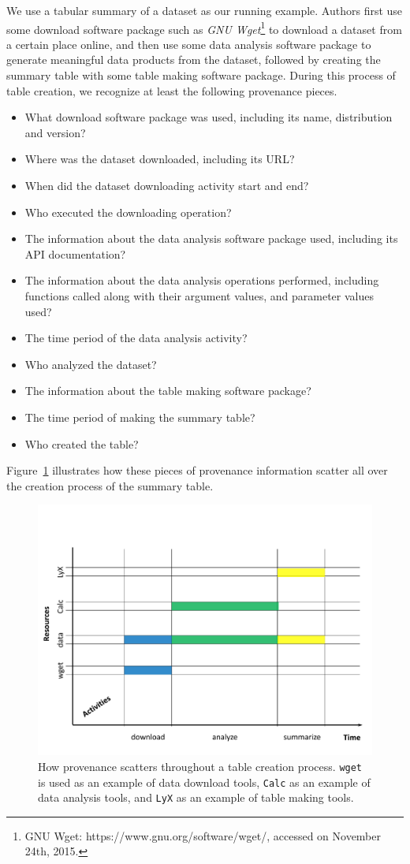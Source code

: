 We use a tabular summary of a dataset as our running example. Authors first use some 
download software package such as \emph{GNU Wget}\footnote{GNU Wget: https://www.gnu.org/software/wget/, accessed on November 24th, 2015.} to download a dataset from a certain place online, and then 
use some data analysis software package to generate meaningful data products from the dataset, 
followed by creating the summary table with some table making software package. During this process 
of table creation, we recognize at least the following provenance pieces.
\begin{itemize}
\item What download software package was used, including its name, distribution and version?
\item Where was the dataset downloaded, including its URL?
\item When did the dataset downloading activity start and end?
\item Who executed the downloading operation?
\item The information about the data analysis software package used, including its API documentation?
\item The information about the data analysis operations performed, including functions called along 
with their argument values, and parameter values used? 
\item The time period of the data analysis activity?
\item Who analyzed the dataset?
\item The information about the table making software package?
\item The time period of making the summary table?
\item Who created the table?
\end{itemize}
Figure~\ref{prov-pieces} illustrates how these pieces of provenance information scatter all over the 
creation process of the summary table.
\begin{figure}
\centering
\includegraphics[scale=0.5]{prov-pieces}
\caption[Provenance for the creation of a table]{How provenance scatters throughout a table creation process. \texttt{wget} is used as an example of data download tools, \texttt{Calc} as an example of data analysis tools, and \texttt{LyX} as an example of table making tools.}
\label{prov-pieces}
\end{figure}
